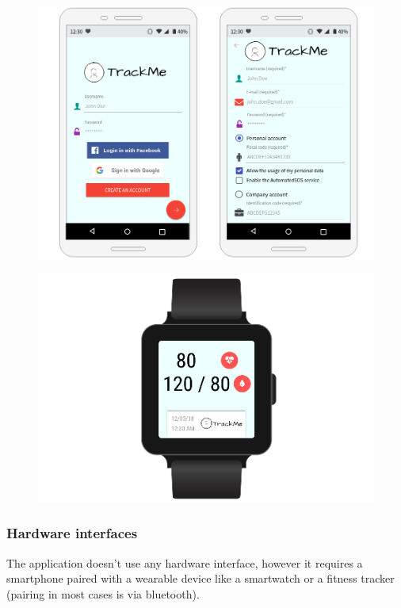 \clearpage
	
\begin{figure}[h!] \ContinuedFloat
\centering
\includegraphics[scale=0.45]{sections/mockups/mockups7,8.png} \newline
{}
\end{figure}
	
\begin{figure}[h!] \ContinuedFloat
\centering
\includegraphics[scale=0.45]{sections/mockups/mockupWatch.png} \newline
{}
\end{figure}

\subsubsection{Hardware interfaces}
The application doesn't use any hardware interface, however it requires a smartphone paired with a wearable device like a smartwatch or a fitness tracker (pairing in most cases is via bluetooth).

